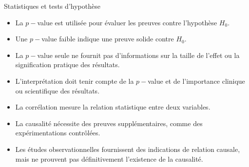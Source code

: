 \documentclass{beamer}
\begin{document}
	
	
	\begin{frame}{Statistiques et tests d'hypothèse}
		\begin{itemize}
			\item La $p-$value est utilisée pour évaluer les preuves contre l'hypothèse $H_0$.
			\item Une $p-$value faible indique une preuve solide contre $H_0$.
			\item La $p-$value seule ne fournit pas d'informations sur la taille de l'effet ou la signification pratique des résultats.
			\item L'interprétation doit tenir compte de la $p-$value et de l'importance clinique ou scientifique des résultats.
		\end{itemize}
		
		\vfill
		
		\begin{itemize}
			\item La corrélation mesure la relation statistique entre deux variables.
			\item La causalité nécessite des preuves supplémentaires, comme des expérimentations contrôlées.
			\item Les études observationnelles fournissent des indications de relation causale, mais ne prouvent pas définitivement l'existence de la causalité.
		\end{itemize}
		
		
	\end{frame}
	
\end{document}
